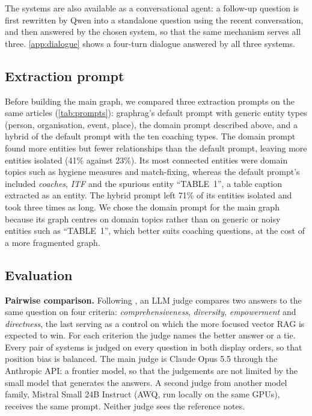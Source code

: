\documentclass{article}
\begin{document}
The systems are also available as a conversational agent: a follow-up
question is first rewritten by Qwen into a standalone question using the recent conversation, and
then answered by the chosen system, so that the same mechanism serves all three.
\cref{app:dialogue} shows a four-turn dialogue answered by all three systems.

\subsection{Extraction prompt}
\label{sec:prompts}
Before building the main graph, we compared three extraction prompts on the same articles
(\cref{tab:prompts}): graphrag's default prompt with generic entity types (person, organisation, event,
place), the domain prompt described above, and a hybrid of the default prompt with the ten coaching
types. The domain prompt found more entities but fewer relationships than the default prompt, leaving more
entities isolated (41\% against 23\%). Its most connected entities were domain topics such as hygiene
measures and match-fixing, whereas the default prompt's included \emph{coaches}, \emph{ITF} and the
spurious entity ``TABLE~1'', a table caption extracted as an entity. The hybrid prompt left 71\% of its
entities isolated and took three times as long.
We chose the domain prompt for the main graph because its graph centres on domain topics rather than on
generic or noisy entities such as ``TABLE~1'', which better suits coaching questions, at the cost of a
more fragmented graph.

\subsection{Evaluation}
\label{sec:evaluation}
\textbf{Pairwise comparison.} Following \citet{edge2024local}, an LLM judge compares two
answers to the same question on four criteria: \emph{comprehensiveness}, \emph{diversity},
\emph{empowerment} and \emph{directness}, the last serving as a control on which the more focused
vector RAG is expected to win. For each criterion the judge names the better answer or a tie. Every pair of systems is judged on every question in both
display orders, so that position bias \cite{wang2023fair} is balanced. The main judge is Claude Opus 5.5
through the Anthropic API: a frontier model, so that the judgements are not limited by the small
model that generates the answers. A second judge from another model family, Mistral Small 24B Instruct
(AWQ, run locally on the same GPUs), receives the same prompt. Neither judge sees the reference notes.
\end{document}
